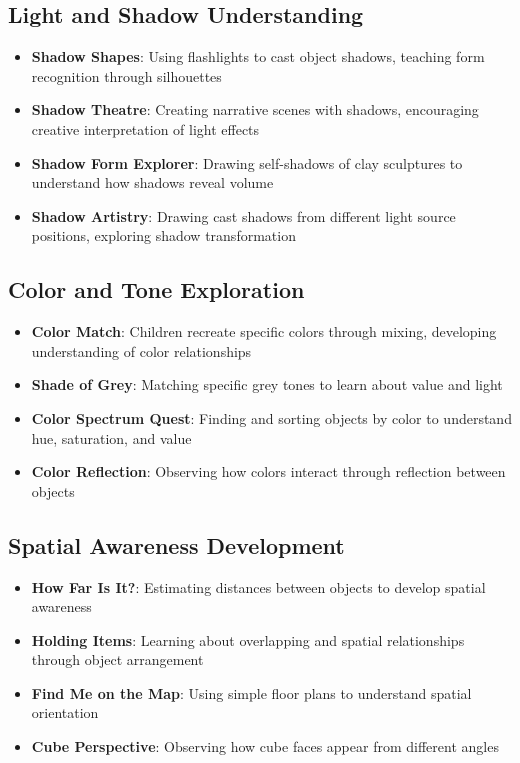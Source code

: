 \documentclass{article}
\begin{document}
\subsection{Light and Shadow Understanding}
\begin{itemize}
    \item \textbf{Shadow Shapes}: Using flashlights to cast object shadows, teaching form recognition through silhouettes
    \item \textbf{Shadow Theatre}: Creating narrative scenes with shadows, encouraging creative interpretation of light effects
    \item \textbf{Shadow Form Explorer}: Drawing self-shadows of clay sculptures to understand how shadows reveal volume
    \item \textbf{Shadow Artistry}: Drawing cast shadows from different light source positions, exploring shadow transformation
\end{itemize}

\subsection{Color and Tone Exploration}
\begin{itemize}
    \item \textbf{Color Match}: Children recreate specific colors through mixing, developing understanding of color relationships
    \item \textbf{Shade of Grey}: Matching specific grey tones to learn about value and light
    \item \textbf{Color Spectrum Quest}: Finding and sorting objects by color to understand hue, saturation, and value
    \item \textbf{Color Reflection}: Observing how colors interact through reflection between objects
\end{itemize}

\subsection{Spatial Awareness Development}
\begin{itemize}
    \item \textbf{How Far Is It?}: Estimating distances between objects to develop spatial awareness
    \item \textbf{Holding Items}: Learning about overlapping and spatial relationships through object arrangement
    \item \textbf{Find Me on the Map}: Using simple floor plans to understand spatial orientation
    \item \textbf{Cube Perspective}: Observing how cube faces appear from different angles
\end{itemize}
\end{document}
